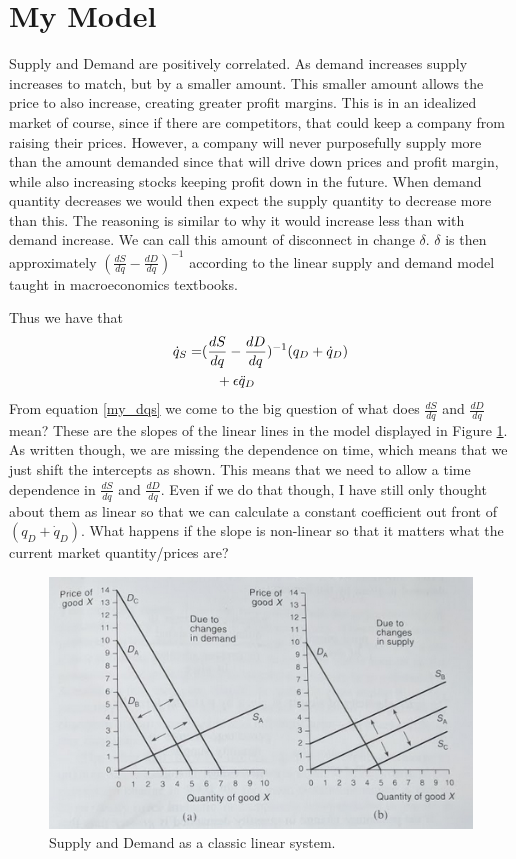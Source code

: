 \documentclass{article}
\begin{document}
\section{My Model}

Supply and Demand are positively correlated. As demand increases supply increases to match, but by a smaller amount. This smaller amount allows the price to also increase, creating greater profit margins. This is in an idealized market of course, since if there are competitors, that could keep a company from raising their prices. However, a company will never purposefully supply more than the amount demanded since that will drive down prices and profit margin, while also increasing stocks keeping profit down in the future. When demand quantity decreases we would then expect the supply quantity to decrease more than this. The reasoning is similar to why it would increase less than with demand increase. We can call this amount of disconnect in change $\delta$. $\delta$ is then approximately $(\frac{dS}{dq} - \frac{dD}{dq})^{-1}$ according to the linear supply and demand model taught in macroeconomics textbooks.

Thus we have that 
\begin{align}
	\dot{q}_S = &  (\frac{dS}{dq} - \frac{dD}{dq})^{-1}(q_D +\dot{q}_D) \label{my_dqs}\\
	& \ \ \ +\epsilon\ddot{q}_D  \label{predict_demand}
\end{align}
From equation \eqref{my_dqs} we come to the big question of what does $\frac{dS}{dq}$ and $\frac{dD}{dq}$ mean? These are the slopes of the linear lines in the model displayed in Figure \ref{fig:SnD}. As written though, we are missing the dependence on time, which means that we just shift the intercepts as shown. This means that we need to allow a time dependence in $\frac{dS}{dq}$ and $\frac{dD}{dq}$. Even if we do that though, I have still only thought about them as linear so that we can calculate a constant coefficient out front of $(q_D +\dot{q}_D)$. What happens if the slope is non-linear so that it matters what the current market quantity/prices are?   

\begin{figure}
	\centering
		\includegraphics[width = 0.6\columnwidth]{Figures/SnD.png}
	\caption{Supply and Demand as a classic linear system.}
	\label{fig:SnD} 
\end{figure}
\end{document}
